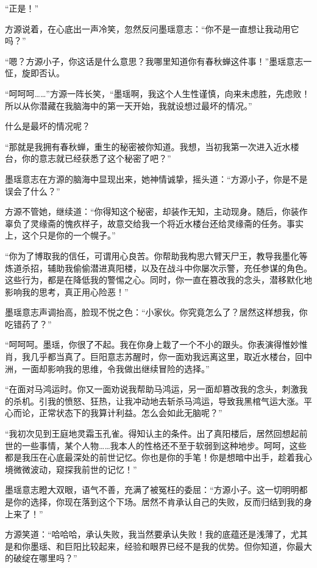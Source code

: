 
\begin{this_body}

“正是！”

方源说着，在心底出一声冷笑，忽然反问墨瑶意志：“你不是一直想让我动用它吗？”

“嗯？方源小子，你这话是什么意思？我哪里知道你有春秋蝉这件事！”墨瑶意志一怔，旋即否认。

“呵呵呵……”方源一阵长笑，“墨瑶啊，我这个人生性谨慎，向来未虑胜，先虑败！所以从你潜藏在我脑海中的第一天开始，我就设想过最坏的情况。”

什么是最坏的情况呢？

“那就是我拥有春秋蝉，重生的秘密被你知道。我想，当初我第一次进入近水楼台，你的意志就已经获悉了这个秘密了吧？”

墨瑶意志在方源的脑海中显现出来，她神情诚挚，摇头道：“方源小子，你是不是误会了什么？”

方源不管她，继续道：“你得知这个秘密，却装作无知，主动现身。随后，你装作辜负了灵缘斋的愧疚样子，故意交给我一个将近水楼台还给灵缘斋的任务。事实上，这个只是你的一个幌子。”

“你为了博取我的信任，可谓用心良苦。你帮助我构思六臂天尸王，教导我墨化等炼道杀招，辅助我偷偷潜进真阳楼，以及在战斗中你屡次示警，充任参谋的角色。这些行为，都是在降低我的警惕之心。同时，你一直在篡改我的念头，潜移默化地影响我的思考，真正用心险恶！”

墨瑶意志声调抬高，脸现不悦之色：“小家伙。你究竟怎么了？居然这样想我，你吃错药了？”

“呵呵呵。墨瑶，你很了不起。我在你身上栽了一个不小的跟头。你表演得惟妙惟肖，我几乎都当真了。巨阳意志苏醒时，你一面劝我远离这里，取近水楼台，回中洲，一面却影响我的思维，令我做出继续冒险的选择。”

“在面对马鸿运时。你又一面劝说我帮助马鸿运，另一面却篡改我的念头，刺激我的杀机。引我的愤怒、狂热，让我冲动地去斩杀马鸿运，导致我黑棺气运大涨。平心而论，正常状态下的我算计利益。怎么会如此无脑呢？”

“我初次见到王庭地灵霜玉孔雀。得知认主的条件。出了真阳楼后，居然回想起前世的一些事情，某个人物……我本人的性格还不至于软弱到这种地步。呵呵，这些都是我压在心底最深处的前世记忆。你也是你的手笔！你是想暗中出手，趁着我心境微微波动，窥探我前世的记忆！”

墨瑶意志瞪大双眼，语气不善，充满了被冤枉的委屈：“方源小子。这一切明明都是你的选择，你现在落到这个下场。居然不肯承认自己的失败，反而归结到我的身上来了！”

方源笑道：“哈哈哈，承认失败，我当然要承认失败！我的底蕴还是浅薄了，尤其是和你墨瑶、和巨阳比较起来，经验和眼界已经不是我的优势。但你知道，你最大的破绽在哪里吗？”


\end{this_body}
